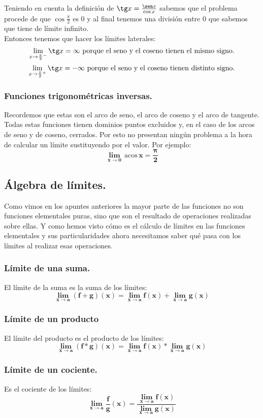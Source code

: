 \documentclass[a4paper,11pt,answers]{exam}
\newcommand\ddfrac[2]{\frac{\displaystyle #1}{\displaystyle #2}}
\newcommand{\acos}{\,\mathrm{acos}\,}
\begin{document}
Teniendo en cuenta la definición de $\tg x = \frac{\sen x}{\cos x}$ sabemos que el problema procede de que $\cos \frac{\pi}{2}$ es 0 y al final tenemos una división entre 0 que sabemos que tiene de límite infinito.\\
Entonces tenemos que hacer los límites laterales:
\[\lim_{x \to \frac{\pi}{2}^-} \tg x = \infty \text{ porque el seno y el coseno tienen el mismo signo.}\]
\[\lim_{x \to \frac{\pi}{2}^+} \tg x = -\infty \text{ porque el seno y el coseno tienen distinto signo.}\]

\subsubsection{Funciones trigonométricas inversas.}
Recordemos que estas son el arco de seno, el arco de coseno y el arco de tangente.\\
Todas estas funciones tienen dominios puntos excluidos y, en el caso de los arcos de seno y de coseno, cerrados. Por esto no presentan ningún problema a la hora de calcular un límite sustituyendo por el valor. Por ejemplo:
\[\boldsymbol{\lim_{x \to 0} \acos x = \frac{\pi}{2}}\]

\subsection{Álgebra de límites.}
Como vimos en los apuntes anteriores la mayor parte de las funciones no son funciones elementales puras, sino que son el resultado de operaciones realizadas sobre ellas. Y como hemos visto cómo es el cálculo de límites en las funciones elementales y sus particularidades ahora necesitamos saber qué pasa con los límites al realizar esas operaciones.

\subsubsection{Límite de una suma.}
El límite de la suma es la suma de los límites:
\[\boldsymbol{\lim_{x \to a}(f+g)(x) = \lim_{x \to a} f(x) + \lim_{x \to a} g(x)}\]

\subsubsection{Límite de un producto}
El límite del producto es el producto de los límites:
\[\boldsymbol{\lim_{x \to a}(f*g)(x) = \lim_{x \to a}f(x) *\lim_{x \to a}g(x)}\]

\subsubsection{Límite de un cociente.}
Es el cociente de los límites:
\[\boldsymbol{\lim_{x \to a}\frac{f}{g}(x) = \ddfrac{\lim_{x \to a} f(x)}{\lim_{x \to a}g(x)}}\]
\end{document}

